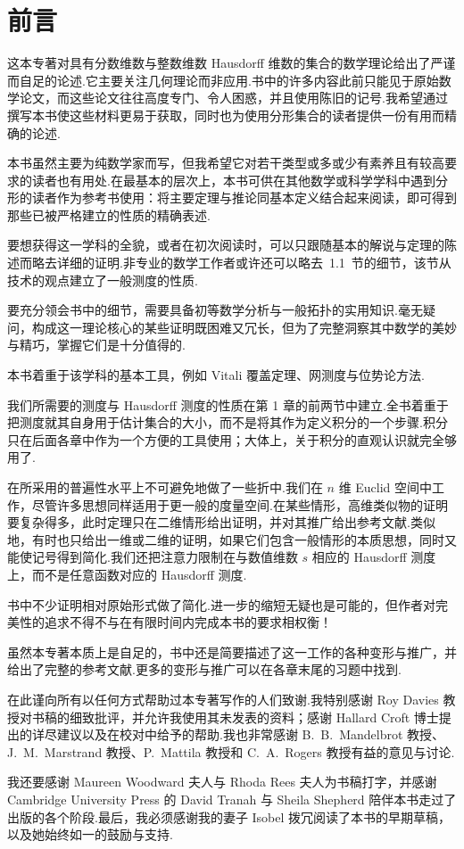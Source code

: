 
\chapter*{前言}

这本专著对具有分数维数与整数维数 Hausdorff 维数的集合的数学理论给出了严谨而自足的论述.它主要关注几何理论而非应用.书中的许多内容此前只能见于原始数学论文，而这些论文往往高度专门、令人困惑，并且使用陈旧的记号.我希望通过撰写本书使这些材料更易于获取，同时也为使用分形集合的读者提供一份有用而精确的论述.

本书虽然主要为纯数学家而写，但我希望它对若干类型或多或少有素养且有较高要求的读者也有用处.在最基本的层次上，本书可供在其他数学或科学学科中遇到分形的读者作为参考书使用：将主要定理与推论同基本定义结合起来阅读，即可得到那些已被严格建立的性质的精确表述.

要想获得这一学科的全貌，或者在初次阅读时，可以只跟随基本的解说与定理的陈述而略去详细的证明.非专业的数学工作者或许还可以略去~1.1~节的细节，该节从技术的观点建立了一般测度的性质.

要充分领会书中的细节，需要具备初等数学分析与一般拓扑的实用知识.毫无疑问，构成这一理论核心的某些证明既困难又冗长，但为了完整洞察其中数学的美妙与精巧，掌握它们是十分值得的.

本书着重于该学科的基本工具，例如 Vitali 覆盖定理、网测度与位势论方法.

我们所需要的测度与 Hausdorff 测度的性质在第 1 章的前两节中建立.全书着重于把测度就其自身用于估计集合的大小，而不是将其作为定义积分的一个步骤.积分只在后面各章中作为一个方便的工具使用；大体上，关于积分的直观认识就完全够用了.

在所采用的普遍性水平上不可避免地做了一些折中.我们在 $n$ 维 Euclid 空间中工作，尽管许多思想同样适用于更一般的度量空间.在某些情形，高维类似物的证明要复杂得多，此时定理只在二维情形给出证明，并对其推广给出参考文献.类似地，有时也只给出一维或二维的证明，如果它们包含一般情形的本质思想，同时又能使记号得到简化.我们还把注意力限制在与数值维数 $s$ 相应的 Hausdorff 测度上，而不是任意函数对应的 Hausdorff 测度.

书中不少证明相对原始形式做了简化.进一步的缩短无疑也是可能的，但作者对完美性的追求不得不与在有限时间内完成本书的要求相权衡！

虽然本专著本质上是自足的，书中还是简要描述了这一工作的各种变形与推广，并给出了完整的参考文献.更多的变形与推广可以在各章末尾的习题中找到.

在此谨向所有以任何方式帮助过本专著写作的人们致谢.我特别感谢 Roy Davies 教授对书稿的细致批评，并允许我使用其未发表的资料；感谢 Hallard Croft 博士提出的详尽建议以及在校对中给予的帮助.我也非常感谢 B.~B.~Mandelbrot 教授、J.~M.~Marstrand 教授、P.~Mattila 教授和 C.~A.~Rogers 教授有益的意见与讨论.

我还要感谢 Maureen Woodward 夫人与 Rhoda Rees 夫人为书稿打字，并感谢 Cambridge University Press 的 David Tranah 与 Sheila Shepherd 陪伴本书走过了出版的各个阶段.最后，我必须感谢我的妻子 Isobel 拨冗阅读了本书的早期草稿，以及她始终如一的鼓励与支持.
